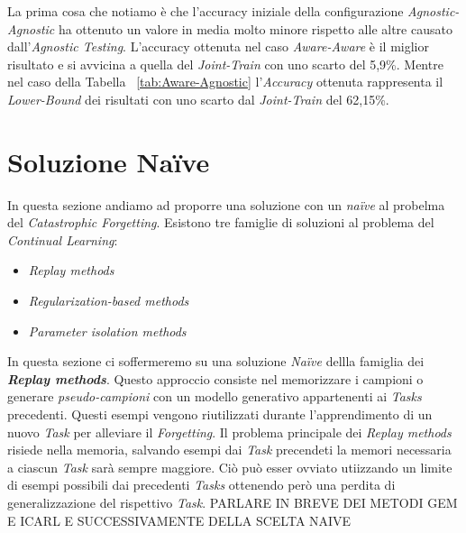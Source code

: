 La prima cosa che notiamo è che l'accuracy iniziale della configurazione \textit{Agnostic-Agnostic} ha ottenuto un valore in media molto minore rispetto alle altre causato dall'\textit{Agnostic Testing}.
L'accuracy ottenuta nel caso \textit{Aware-Aware} è il miglior risultato e si avvicina a quella del \textit{Joint-Train} con uno scarto del 5,9\%. Mentre nel caso della Tabella ~\ref{tab:Aware-Agnostic} l'\textit{Accuracy} ottenuta rappresenta il \textit{Lower-Bound} dei risultati con uno scarto dal \textit{Joint-Train} del 62,15\%. 
\section{Soluzione Naïve}
In questa sezione andiamo ad proporre una soluzione con un \textit{naïve} al probelma del \textit{Catastrophic Forgetting}. Esistono tre famiglie di soluzioni al problema del \textit{Continual Learning}:
\begin{itemize}
    \item \textit{Replay methods}
    \item \textit{Regularization-based methods}
    \item\textit{Parameter isolation methods}
\end{itemize}
In questa sezione ci soffermeremo su una soluzione \textit{Naïve} dellla famiglia dei \textit{\textbf{Replay methods}}. Questo approccio consiste nel memorizzare i campioni o generare \textit{pseudo-campioni} con un modello generativo appartenenti ai \textit{Tasks} precedenti. Questi esempi  vengono riutilizzati durante l'apprendimento di un nuovo \textit{Task} per alleviare il \textit{Forgetting}.\newline
Il problema principale dei \textit{Replay methods} risiede nella memoria, salvando esempi dai \textit{Task} precendeti la memori necessaria a ciascun \textit{Task} sarà sempre maggiore. Ciò può esser ovviato utiizzando un limite di esempi possibili dai precedenti \textit{Tasks} ottenendo però una perdita di generalizzazione del rispettivo \textit{Task}.
PARLARE IN BREVE DEI METODI GEM E ICARL E SUCCESSIVAMENTE DELLA SCELTA NAIVE